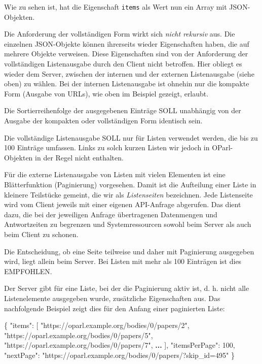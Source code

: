 \documentclass[,a4paper]{article}
\newenvironment{Shaded}{}{}
\newcommand{\DataTypeTok}[1]{\textcolor[rgb]{0.56,0.13,0.00}{{#1}}}
\newcommand{\DecValTok}[1]{\textcolor[rgb]{0.25,0.63,0.44}{{#1}}}
\newcommand{\StringTok}[1]{\textcolor[rgb]{0.25,0.44,0.63}{{#1}}}
\newcommand{\OtherTok}[1]{\textcolor[rgb]{0.00,0.44,0.13}{{#1}}}
\newcommand{\FunctionTok}[1]{\textcolor[rgb]{0.02,0.16,0.49}{{#1}}}
\newcommand{\ErrorTok}[1]{\textcolor[rgb]{1.00,0.00,0.00}{\textbf{{#1}}}}
\begin{document}
Wie zu sehen ist, hat die Eigenschaft \texttt{items} als Wert nun ein
Array mit JSON-Objekten.

Die Anforderung der vollständigen Form wirkt sich \emph{nicht rekursiv}
aus. Die einzelnen JSON-Objekte können ihrerseits wieder Eigenschaften
haben, die auf mehrere Objekte verweisen. Diese Eigenschaften sind von
der Anforderung der vollständigen Listenausgabe durch den Client nicht
betroffen. Hier obliegt es wieder dem Server, zwischen der internen und
der externen Listenausgabe (siehe oben) zu wählen. Bei der internen
Listenausgabe ist ohnehin nur die kompakte Form (Ausgabe von URLs), wie
oben im Beispiel gezeigt, erlaubt.

Die Sortierreihenfolge der ausgegebenen Einträge SOLL unabhängig von der
Ausgabe der kompakten oder vollständigen Form identisch sein.

Die vollständige Listenausgabe SOLL nur für Listen verwendet werden, die
bis zu 100 Einträge umfassen. Links zu solch kurzen Listen wir jedoch in
OParl-Objekten in der Regel nicht enthalten.


Für die externe Listenausgabe von Listen mit vielen Elementen ist eine
Blätterfunktion (Paginierung) vorgesehen. Damit ist die Aufteilung einer
Liste in kleinere Teilstücke gemeint, die wir als \emph{Listenseiten}
bezeichnen. Jede Listenseite wird vom Client jeweils mit einer eigenen
API-Anfrage abgerufen. Das dient dazu, die bei der jeweiligen Anfrage
übertragenen Datenmengen und Antwortzeiten zu begrenzen und
Systemressourcen sowohl beim Server als auch beim Client zu schonen.

Die Entscheidung, ob eine Seite teilweise und daher mit Paginierung
ausgegeben wird, liegt allein beim Server. Bei Listen mit mehr als 100
Einträgen ist dies EMPFOHLEN.

Der Server gibt für eine Liste, bei der die Paginierung aktiv ist, d. h.
nicht alle Listenelemente ausgegeben wurde, zusätzliche Eigenschaften
aus. Das nachfolgende Beispiel zeigt dies für den Anfang einer
paginierten Liste:

\begin{Shaded}
\begin{Highlighting}[]
\FunctionTok{\{}
    \DataTypeTok{"items"}\FunctionTok{:} \OtherTok{[}
        \StringTok{"https://oparl.example.org/bodies/0/papers/2"}\OtherTok{,}
        \StringTok{"https://oparl.example.org/bodies/0/papers/5"}\OtherTok{,}
        \StringTok{"https://oparl.example.org/bodies/0/papers/7"}\OtherTok{,}
        \ErrorTok{...}
    \OtherTok{]}\FunctionTok{,}
    \DataTypeTok{"itemsPerPage"}\FunctionTok{:} \DecValTok{100}\FunctionTok{,}
    \DataTypeTok{"nextPage"}\FunctionTok{:} \StringTok{"https://oparl.example.org/bodies/0/papers/?skip_id=495"}
\FunctionTok{\}}
\end{Highlighting}
\end{Shaded}
\end{document}
